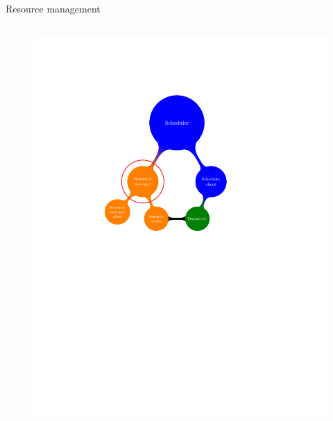 \documentclass{beamer}
\begin{document}
\begin{frame}{Resource management}
\begin{columns}
\begin{column}[l]{0.5\linewidth}
{\begin{figure}
            \includegraphics[trim=5.5cm 14.3cm 2cm 6.3cm,scale=0.69]{rm.pdf}
        \end{figure}
        }
\end{column}
\end{columns}
\end{frame}
\end{document}
